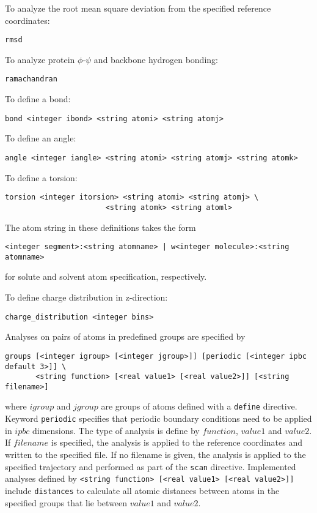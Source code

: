 To analyze the root mean square deviation from the specified reference
coordinates:

\begin{verbatim}
rmsd
\end{verbatim}

To analyze protein $\phi$-$\psi$ and backbone hydrogen bonding:

\begin{verbatim}
ramachandran
\end{verbatim}

To define a bond:

\begin{verbatim}
bond <integer ibond> <string atomi> <string atomj> 
\end{verbatim}

To define an angle:

\begin{verbatim}
angle <integer iangle> <string atomi> <string atomj> <string atomk> 
\end{verbatim}

To define a torsion:

\begin{verbatim}
torsion <integer itorsion> <string atomi> <string atomj> \
                       <string atomk> <string atoml> 
\end{verbatim}

The atom string in these definitions takes the form

\begin{verbatim}
<integer segment>:<string atomname> | w<integer molecule>:<string atomname>
\end{verbatim}

for solute and solvent atom specification, respectively.

To define charge distribution in z-direction:

\begin{verbatim}
charge_distribution <integer bins>
\end{verbatim}

Analyses on pairs of atoms in predefined groups are specified by

\begin{verbatim}
groups [<integer igroup> [<integer jgroup>]] [periodic [<integer ipbc default 3>]] \ 
       <string function> [<real value1> [<real value2>]] [<string filename>]
\end{verbatim}

where $igroup$ and $jgroup$ are groups of atoms defined with a
\verb+define+ directive. Keyword \verb+periodic+ specifies that
periodic boundary conditions need to be applied in $ipbc$ dimensions.
The type of analysis is define by $function$, $value1$ and $value2$.
If $filename$ is specified, the analysis is applied to the reference
coordinates and written to the specified file. If no filename is
given, the analysis is applied to the specified trajectory and 
performed as part of the \verb+scan+ directive.
Implemented analyses defined by 
\verb+<string function> [<real value1> [<real value2>]]+ include
\verb+distances+ to calculate all atomic distances between atoms
in the specified groups that lie between $value1$ and $value2$.


